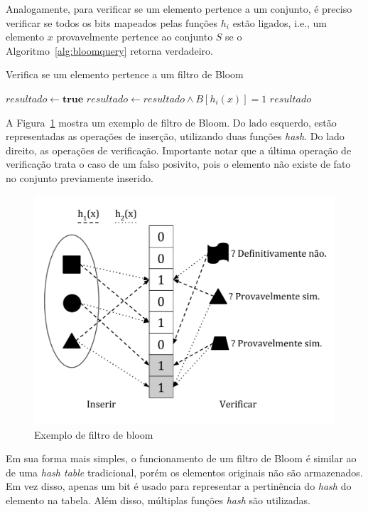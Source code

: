 Analogamente, para verificar se um elemento pertence a um conjunto, é preciso verificar se todos os bits mapeados pelas funções $h_i$ estão ligados, i.e., um elemento $x$ provavelmente pertence ao conjunto $S$ se o Algoritmo~\ref{alg:bloomquery} retorna verdadeiro.

\begin{algorithm}
\linespread{1}\selectfont
\caption{Verifica se um elemento pertence a um filtro de Bloom}
\label{alg:bloomquery}
\begin{algorithmic}[1]
    \State $resultado \gets \textbf{true}$ 
        \State $resultado \gets resultado \land B[h_i(x)] = 1$
	\EndFor
	\Return $resultado$
\EndFunction
\end{algorithmic}
\end{algorithm}

A Figura~\ref{fig:bloom1} mostra um exemplo de filtro de Bloom. Do lado esquerdo, estão representadas as operações de inserção, utilizando duas funções \emph{hash}. Do lado direito, as operações de verificação. Importante notar que a última operação de verificação trata o caso de um falso posivito, pois o elemento não existe de fato no conjunto previamente inserido.

\begin{figure}[!htbp]
  \centering
  \includegraphics[scale=0.45]{files/bloom1.pdf}
  \caption{Exemplo de filtro de bloom}
  \label{fig:bloom1}
\end{figure}

Em sua forma mais simples, o funcionamento de um filtro de Bloom é similar ao de uma \emph{hash table} tradicional, porém os elementos originais não são armazenados. Em vez disso, apenas um bit é usado para representar a pertinência do \emph{hash} do elemento na tabela. Além disso, múltiplas funções \emph{hash} são utilizadas.

